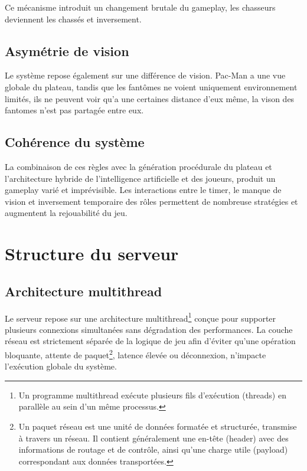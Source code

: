 \documentclass[a4paper, 11pt]{report}
\begin{document}
Ce mécanisme introduit un changement brutale du gameplay, les chasseurs deviennent les chassés et inversement.

\subsection{Asymétrie de vision}

Le système repose également sur une différence de vision.
Pac-Man a une vue globale du plateau, tandis que les fantômes ne voient uniquement environnement limités, ils ne peuvent voir qu'a une certaines distance d'eux même, la vison des fantomes n'est pas partagée entre eux.

\subsection{Cohérence du système}

La combinaison de ces règles avec la génération procédurale du plateau et l’architecture hybride de l’intelligence artificielle et des joueurs, produit un gameplay varié et imprévisible.
Les interactions entre le timer, le manque de vision et inversement temporaire des rôles permettent de nombreuse stratégies et augmentent la rejouabilité du jeu.



\section{Structure du serveur}

\subsection{Architecture multithread}

Le serveur repose sur une architecture multithread\footnote{Un programme multithread exécute plusieurs fils d'exécution (threads) en parallèle au sein d’un même processus.} conçue pour supporter plusieurs connexions simultanées sans dégradation des performances. 
La couche réseau est strictement séparée de la logique de jeu afin d’éviter qu’une opération bloquante, attente de paquet\footnote{Un paquet réseau est une unité de données formatée et structurée, transmise à travers un réseau. Il contient généralement une en-tête (header) avec des informations de routage et de contrôle, ainsi qu’une charge utile (payload) correspondant aux données transportées.}, latence élevée ou déconnexion, n’impacte l’exécution globale du système.
\end{document}
